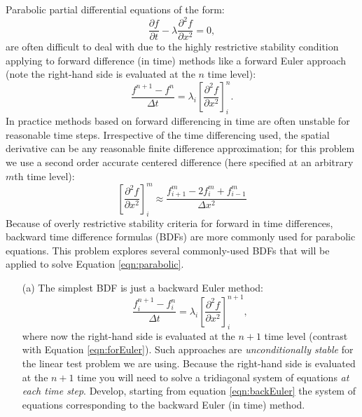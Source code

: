 \documentclass{article}
\begin{document}
\begin{enumerate}
Parabolic partial differential equations of the form:
\begin{equation}
  \frac{\partial f}{\partial t} - \lambda \frac{\partial^2 f}{\partial x^2}= 0, \label{eqn:parabolic}
\end{equation}
 are often difficult to deal with due to the highly restrictive stability condition applying to forward difference (in time) methods like a forward Euler approach (note the right-hand side is evaluated at the $n$ time level):
\begin{equation}
  \frac{f^{n+1}-f^n}{\Delta t} =  \lambda_i \left[ \frac{\partial^2 f}{\partial x^2} \right]_i^n. \label{eqn:forEuler}
\end{equation}
In practice methods based on forward differencing in time are often unstable for reasonable time steps.  Irrespective of the time differencing used, the spatial derivative can be any reasonable finite difference approximation; for this problem we use a second order accurate centered difference (here specified at an arbitrary $m$th time level):
\begin{equation}
\left[ \frac{\partial^2 f}{\partial x^2} \right]_i^m \approx \frac{f_{i+1}^m - 2 f_i^m + f_{i-1}^m}{\Delta x^2} \label{eqn:spacederiv}
\end{equation}
Because of overly restrictive stability criteria for forward in time differences, backward time difference formulas (BDFs) are more commonly used for parabolic equations.  This problem explores several commonly-used BDFs that will be applied to solve Equation \ref{eqn:parabolic}.  
  \begin{enumerate}
    \item[(a)]  The simplest BDF is just a backward Euler method:
    \begin{equation}
      \frac{f_i^{n+1}-f_i^n}{\Delta t} =  \lambda_i \left[ \frac{\partial^2 f}{\partial x^2} \right]_i^{n+1}, \label{eqn:backEuler}
    \end{equation}
    where now the right-hand side is evaluated at the $n+1$ time level (contrast with Equation \ref{eqn:forEuler}).  Such approaches are \emph{unconditionally stable} for the linear test problem we are using.  Because the right-hand side is evaluated at the $n+1$ time you will need to solve a tridiagonal system of equations \emph{at each time step}.  Develop, starting from equation \ref{eqn:backEuler} the system of equations corresponding to the backward Euler (in time) method.   

\end{enumerate}
\end{enumerate}
\end{document}
